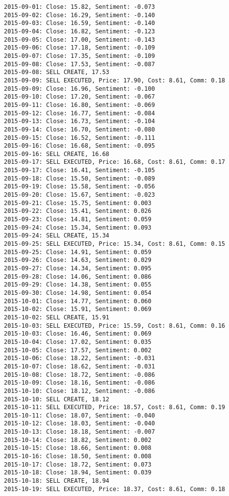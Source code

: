\documentclass[11pt]{article}
\begin{document}
\begin{Verbatim}[commandchars=\\\{\}]
2015-09-01: Close: 15.82, Sentiment: -0.073
2015-09-02: Close: 16.29, Sentiment: -0.140
2015-09-03: Close: 16.59, Sentiment: -0.140
2015-09-04: Close: 16.82, Sentiment: -0.123
2015-09-05: Close: 17.00, Sentiment: -0.143
2015-09-06: Close: 17.18, Sentiment: -0.109
2015-09-07: Close: 17.35, Sentiment: -0.109
2015-09-08: Close: 17.53, Sentiment: -0.087
2015-09-08: SELL CREATE, 17.53
2015-09-09: SELL EXECUTED, Price: 17.90, Cost: 8.61, Comm: 0.18
2015-09-09: Close: 16.96, Sentiment: -0.100
2015-09-10: Close: 17.20, Sentiment: -0.067
2015-09-11: Close: 16.80, Sentiment: -0.069
2015-09-12: Close: 16.77, Sentiment: -0.084
2015-09-13: Close: 16.73, Sentiment: -0.104
2015-09-14: Close: 16.70, Sentiment: -0.080
2015-09-15: Close: 16.52, Sentiment: -0.111
2015-09-16: Close: 16.68, Sentiment: -0.095
2015-09-16: SELL CREATE, 16.68
2015-09-17: SELL EXECUTED, Price: 16.68, Cost: 8.61, Comm: 0.17
2015-09-17: Close: 16.41, Sentiment: -0.105
2015-09-18: Close: 15.50, Sentiment: -0.089
2015-09-19: Close: 15.58, Sentiment: -0.056
2015-09-20: Close: 15.67, Sentiment: -0.023
2015-09-21: Close: 15.75, Sentiment: 0.003
2015-09-22: Close: 15.41, Sentiment: 0.026
2015-09-23: Close: 14.81, Sentiment: 0.059
2015-09-24: Close: 15.34, Sentiment: 0.093
2015-09-24: SELL CREATE, 15.34
2015-09-25: SELL EXECUTED, Price: 15.34, Cost: 8.61, Comm: 0.15
2015-09-25: Close: 14.91, Sentiment: 0.059
2015-09-26: Close: 14.63, Sentiment: 0.029
2015-09-27: Close: 14.34, Sentiment: 0.095
2015-09-28: Close: 14.06, Sentiment: 0.086
2015-09-29: Close: 14.38, Sentiment: 0.055
2015-09-30: Close: 14.98, Sentiment: 0.054
2015-10-01: Close: 14.77, Sentiment: 0.060
2015-10-02: Close: 15.91, Sentiment: 0.069
2015-10-02: SELL CREATE, 15.91
2015-10-03: SELL EXECUTED, Price: 15.59, Cost: 8.61, Comm: 0.16
2015-10-03: Close: 16.46, Sentiment: 0.069
2015-10-04: Close: 17.02, Sentiment: 0.035
2015-10-05: Close: 17.57, Sentiment: 0.002
2015-10-06: Close: 18.22, Sentiment: -0.031
2015-10-07: Close: 18.62, Sentiment: -0.031
2015-10-08: Close: 18.72, Sentiment: -0.086
2015-10-09: Close: 18.16, Sentiment: -0.086
2015-10-10: Close: 18.12, Sentiment: -0.086
2015-10-10: SELL CREATE, 18.12
2015-10-11: SELL EXECUTED, Price: 18.57, Cost: 8.61, Comm: 0.19
2015-10-11: Close: 18.07, Sentiment: -0.040
2015-10-12: Close: 18.03, Sentiment: -0.040
2015-10-13: Close: 18.18, Sentiment: -0.007
2015-10-14: Close: 18.82, Sentiment: 0.002
2015-10-15: Close: 18.66, Sentiment: 0.008
2015-10-16: Close: 18.50, Sentiment: 0.008
2015-10-17: Close: 18.72, Sentiment: 0.073
2015-10-18: Close: 18.94, Sentiment: 0.039
2015-10-18: SELL CREATE, 18.94
2015-10-19: SELL EXECUTED, Price: 18.37, Cost: 8.61, Comm: 0.18

\end{Verbatim}
\end{document}
